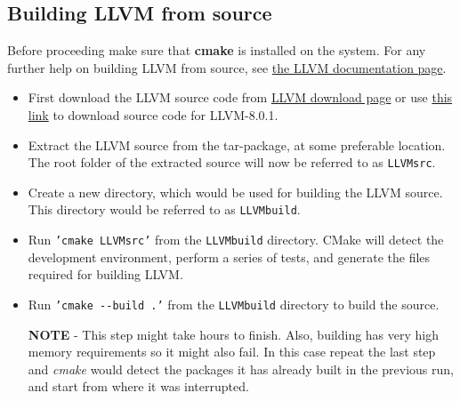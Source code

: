 \subsection{Building LLVM from source}
\label{subsec:BuildingLLVMFromSource}

Before proceeding make sure that \textbf{cmake} is installed on the 
system. For any further help on building LLVM from source, see 
\href{https://llvm.org/docs/CMake.html}{the LLVM documentation page}.

\begin{itemize} \tightlist
    \item First download the LLVM source code from 
    \href{http://releases.llvm.org/download.html}{LLVM download page} 
    or use \href{https://github.com/llvm/llvm-project/releases/download/llvmorg-8.0.1/llvm-8.0.1.src.tar.xz}{this link}
    to download source code for LLVM-8.0.1. 
    \item Extract the LLVM source from the tar-package, at some 
    preferable location. The root folder of the extracted source 
    will now be referred to as \texttt{LLVMsrc}.
    \item Create a new directory, which would be used for building 
    the LLVM source. This directory would be referred to as 
    \texttt{LLVMbuild}.
    \item Run \texttt{'cmake LLVMsrc'} from the \texttt{LLVMbuild} 
    directory. CMake will detect the development environment, perform 
    a series of tests, and generate the files required for building 
    LLVM. 
    \item Run \texttt{'cmake -{}-build .'} from the \texttt{LLVMbuild}
    directory to build the source.

    \textbf{NOTE} - This step might take hours to finish. Also, 
    building has very high memory requirements so it might also fail. 
    In this case repeat the last step and \textit{cmake} would detect 
    the packages it has already built in the previous run, and start 
    from where it was interrupted.
\end{itemize}
        
